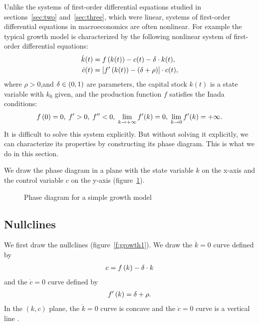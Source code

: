 \documentclass[letterpaper,12pt,leqno]{article}
\newcommand{\pdf}{phasediagrams.pdf}
\begin{document}
Unlike the systems of first-order differential equations studied in sections~\ref{sec:two} and~\ref{sec:three}, which were linear, systems of first-order differential equations in macroeconomics are often nonlinear. For example the typical growth model is characterized by the following nonlinear system of first-order differential equations:
\begin{align}
\dot{k}(t) &=f\left( k(t) \right) -c(t)-\delta \cdot k(t),  \label{eq:growth1} \\
\dot{c}(t) &=\left[ f'\left( k(t) \right) -\left( \delta+\rho \right) \right]\cdot c(t), \label{eq:growth2}
\end{align}
where $\rho >0$,and $\delta \in \left( 0,1 \right)$ are parameters, the capital stock $k(t)$ is a state variable
with $k_{0}$ given, and the production function $f$ satisfies the Inada conditions:
\begin{align*}
f\left( 0 \right)=0,\; f'>0,\;f''<0,\;\lim_{k\to +\infty}f'(k)=0,\;\lim_{k\to 0}f'(k) =+\infty.
\end{align*}
It is difficult to solve this system explicitly. But without solving it explicitly, we can characterize its properties by constructing its phase diagram. This is what we do in this section.

We draw the phase diagram in a plane with the state variable $k$ on the x-axis and the control variable $c$ on the y-axis (figure~\ref{f:growth}).


\begin{figure}[p]
\hfill
{}\vfig
{}\hfill
{}
\caption{Phase diagram for a simple growth model}
\label{f:growth}\end{figure}

\subsection{Nullclines}

We first draw the nullclines (figure~\ref{f:growth1}). We draw the $\dot{k}=0$ curve defined by
\begin{align*}
c=f\left( k \right) -\delta\cdot k
\end{align*}
and the $\dot{c}=0$ curve defined by
\begin{align*}
f^{\prime}\left( k \right) =\delta +\rho.
\end{align*}
In the $(k,c)$ plane, the $\dot{k}=0$ curve is concave and the $\dot{c}=0$ curve is a vertical line .
\end{document}
